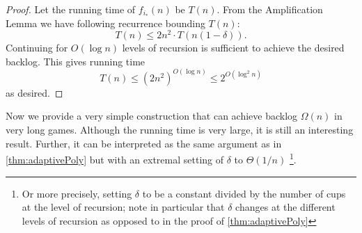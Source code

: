 \documentclass[twocolumn]{article}[10pt]
\begin{document}
\begin{proof}






  Let the running time of $f_{i_*}(n)$ be $T(n)$. From the Amplification Lemma we have 
  following recurrence bounding $T(n)$:
  $$T(n) \le 2n^2 \cdot T(n(1-\delta)).$$
  Continuing for $O(\log n)$ levels of recursion is sufficient to
  achieve the desired backlog. This gives running time
  $$T(n) \le (2n^2)^{O(\log n)} \le 2^{O(\log^2 n)}$$
  as desired.

\end{proof}

Now we provide a very simple construction that can achieve backlog $\Omega(n)$
in very long games. Although the running time is very large, it is
still an interesting result. Further, it can be interpreted as the same
argument as in \cref{thm:adaptivePoly} but with an extremal setting of
$\delta$ to $\Theta(1/n)$ \footnote{Or more precisely, setting $\delta$ to
be a constant divided by the number of cups at the level of
recursion; note in particular that $\delta$ changes at the
different levels of recursion as opposed to in the proof of
 \cref{thm:adaptivePoly}}.
\end{document}
